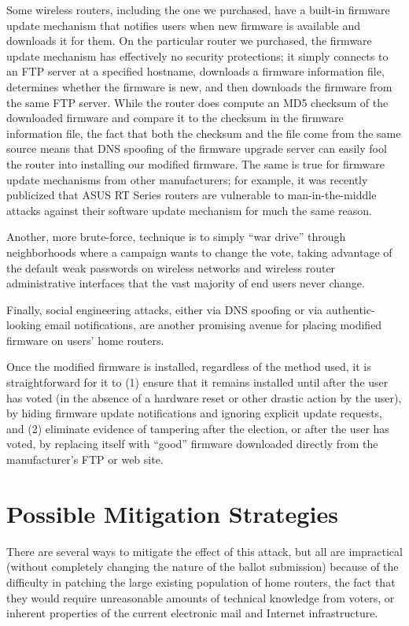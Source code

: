 \documentclass{article}
\begin{document}
Some wireless routers, including the one we purchased, have a built-in
firmware update mechanism that notifies users when new firmware is
available and downloads it for them. On the particular router we
purchased, the firmware update mechanism has effectively no security
protections; it simply connects to an FTP server at a specified
hostname, downloads a firmware information file, determines whether
the firmware is new, and then downloads the firmware from the same FTP
server. While the router does compute an MD5 checksum of the
downloaded firmware and compare it to the checksum in the firmware
information file, the fact that both the checksum and the file come
from the same source means that DNS spoofing of the firmware upgrade
server can easily fool the router into installing our modified
firmware. The same is true for firmware update mechanisms from other
manufacturers; for example, it was recently publicized that ASUS RT
Series routers are vulnerable to man-in-the-middle attacks against
their software update mechanism for much the same
reason.~\cite{AsusMITM}

Another, more brute-force, technique is to simply ``war drive''
through neighborhoods where a campaign wants to change the vote,
taking advantage of the default weak passwords on wireless networks
and wireless router administrative interfaces that the vast majority
of end users never change.

Finally, social engineering attacks, either via DNS spoofing or via
authentic-looking email notifications, are another promising avenue
for placing modified firmware on users' home routers.

Once the modified firmware is installed, regardless of the method
used, it is straightforward for it to (1) ensure that it remains
installed until after the user has voted (in the absence of a hardware
reset or other drastic action by the user), by hiding firmware update
notifications and ignoring explicit update requests, and (2) eliminate
evidence of tampering after the election, or after the user has voted,
by replacing itself with ``good'' firmware downloaded directly from
the manufacturer's FTP or web site.

\section{Possible Mitigation Strategies}

There are several ways to mitigate the effect of this attack, but all
are impractical (without completely changing the nature of the ballot
submission) because of the difficulty in patching the large existing
population of home routers, the fact that they would require
unreasonable amounts of technical knowledge from voters, or inherent
properties of the current electronic mail and Internet infrastructure.
\end{document}

